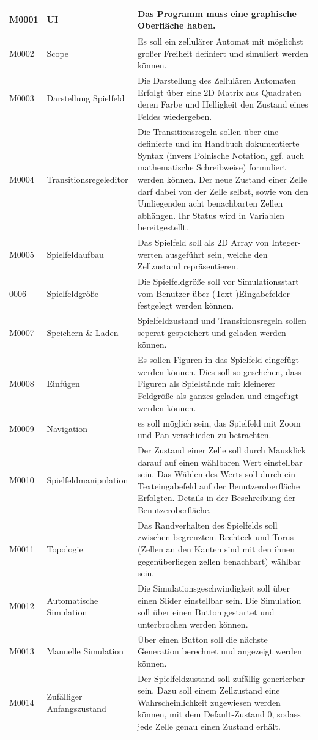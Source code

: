 \documentclass[11pt,a4paper]{article}
\begin{document}
\begin{longtable}[m]{|m{2.2cm}|m{4cm}|m{8cm}|}
\hline
M0001     & UI & Das Programm muss eine graphische Oberfläche haben.  \\
\hline
M0002 & Scope & Es soll ein zellulärer Automat mit möglichst großer Freiheit definiert und simuliert werden können.  \\
\hline
M0003 & Darstellung Spielfeld & Die Darstellung des Zellulären Automaten Erfolgt über eine 2D Matrix aus Quadraten deren Farbe und Helligkeit den Zustand eines Feldes wiedergeben. \\
\hline
M0004 & Transitionsregeleditor & Die Transitionsregeln sollen über eine definierte und im Handbuch dokumentierte Syntax (invers Polnische Notation, ggf. auch mathematische Schreibweise) formuliert werden können. Der neue Zustand einer Zelle darf dabei von der Zelle selbst, sowie von den Umliegenden acht benachbarten Zellen abhängen. Ihr Status wird in Variablen bereitgestellt.\\
\hline
M0005 & Spielfeldaufbau & Das Spielfeld soll als 2D Array von Integer-werten ausgeführt sein, welche den Zellzustand repräsentieren.\\
\hline
0006 & Spielfeldgröße & Die Spielfeldgröße soll vor Simulationsstart vom Benutzer über (Text-)Eingabefelder festgelegt werden können.\\
\hline
M0007 & Speichern \& Laden & Spielfeldzustand und Transitionsregeln sollen seperat gespeichert und geladen werden können.  \\
\hline
M0008 & Einfügen & Es sollen Figuren in das Spielfeld eingefügt werden können. Dies soll so geschehen, dass Figuren als Spielstände mit kleinerer Feldgröße als ganzes geladen und eingefügt werden können. \\
\hline
M0009 & Navigation & es soll möglich sein, das Spielfeld mit Zoom und Pan verschieden zu betrachten. \\
\hline
M0010 & Spielfeldmanipulation & Der Zustand einer Zelle soll durch Mausklick darauf auf einen wählbaren Wert einstellbar sein. Das Wählen des Werts soll durch ein Texteingabefeld auf der Benutzeroberfläche Erfolgten. Details in der Beschreibung der Benutzeroberfläche.\\
\hline
M0011 & Topologie & Das Randverhalten des Spielfelds soll zwischen begrenztem Rechteck und Torus (Zellen an den Kanten sind mit den ihnen gegenüberliegen zellen benachbart) wählbar sein.\\
\hline
M0012 & Automatische Simulation & Die Simulationsgeschwindigkeit soll über einen Slider einstellbar sein. Die Simulation soll über einen Button gestartet und unterbrochen werden können.\\
\hline
M0013 & Manuelle Simulation & Über einen Button soll die nächste Generation berechnet und angezeigt werden können. \\
\hline
M0014 & Zufälliger Anfangszustand & Der Spielfeldzustand soll zufällig generierbar sein. Dazu soll einem Zellzustand eine Wahrscheinlichkeit zugewiesen werden können, mit dem Default-Zustand 0, sodass jede Zelle genau einen Zustand erhält.\\


\end{longtable}
\end{document}
